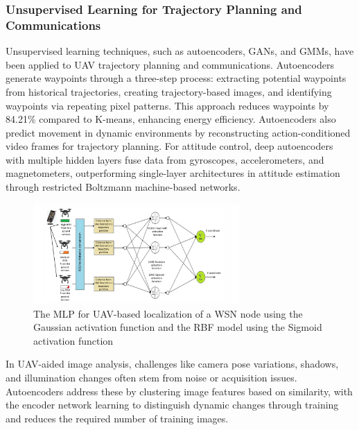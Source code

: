 


\subsubsection{Unsupervised Learning for Trajectory Planning and
 Communications}


Unsupervised learning techniques, such as autoencoders, GANs, and GMMs, have been applied to UAV trajectory planning and communications. Autoencoders generate waypoints through a three-step process: extracting potential waypoints from historical trajectories, creating trajectory-based images, and identifying waypoints via repeating pixel patterns. This approach reduces waypoints by 84.21\% compared to K-means, enhancing energy efficiency. Autoencoders also predict movement in dynamic environments by reconstructing action-conditioned video frames for trajectory planning. For attitude control, deep autoencoders with multiple hidden layers fuse data from gyroscopes, accelerometers, and magnetometers, outperforming single-layer architectures in attitude estimation through restricted Boltzmann machine-based networks.


\begin{figure}[H]
\centering
\includegraphics[width=0.7\textwidth]{Figures/Chapter2/Section1/1.png}
\caption{The MLP for UAV-based localization of a WSN node using the Gaussian activation function \cite{annepu2020uav} and the RBF model
 using the Sigmoid activation function \cite{annepu2021radial}}
\label{fig:mlp-uav-localization}
\end{figure}


In UAV-aided image analysis, challenges like camera pose variations, shadows, and illumination changes often stem from noise or acquisition issues. Autoencoders address these by clustering image features based on similarity, with the encoder network learning to distinguish dynamic changes through training and reduces the required number of training images.




